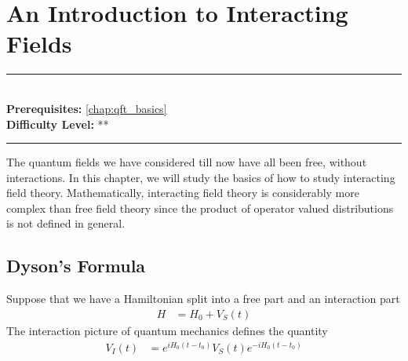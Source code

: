 \documentclass[book.tex]{subfiles}
\begin{document}
\chapter{An Introduction to Interacting Fields}

\label{chap:perturbative_expansion}
\noindent\rule{11cm}{0.4pt} \\
\textbf{Prerequisites:} \autoref{chap:qft_basics}  \\
\textbf{Difficulty Level:} ** \\
\noindent\rule{11cm}{0.4pt}
\vspace{5mm}

The quantum fields we have considered till now have all been free, without interactions. In this chapter, we will study the basics of how to study interacting field theory. Mathematically, interacting field theory is considerably more complex than free field theory since the product of operator valued distributions is not defined in general. 



\section{Dyson's Formula}

Suppose that we have a Hamiltonian split into a free part and an interaction part
\begin{align}
    H &= H_0 + V_S(t)
\end{align}
The interaction picture of quantum mechanics defines the quantity
\begin{align}
    V_I(t) &= e^{iH_0(t-t_0)}V_S(t)e^{-iH_0(t-t_0)}
\end{align}
\end{document}
